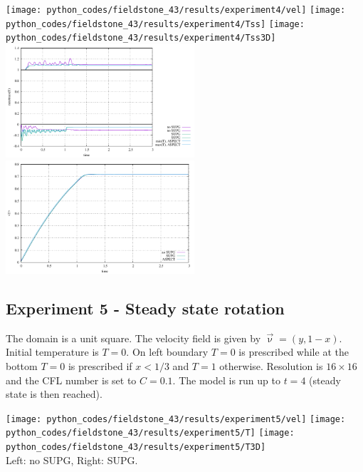 \begin{center}
\texttt{[image: python\_codes/fieldstone\_43/results/experiment4/vel]}
\texttt{[image: python\_codes/fieldstone\_43/results/experiment4/Tss]}
\texttt{[image: python\_codes/fieldstone\_43/results/experiment4/Tss3D]}\\
\includegraphics[width=7cm]{python_codes/fieldstone_43/results/experiment4/stats_T}
\includegraphics[width=7cm]{python_codes/fieldstone_43/results/experiment4/avrg_T}
\end{center}

\subsection*{Experiment 5 - Steady state rotation }

The domain is a unit square. The velocity field is given by $\vec\upnu=(y,1-x)$. Initial temperature is 
$T=0$. On left boundary $T=0$ is prescribed while at the bottom $T=0$ is prescribed if $x<1/3$ and $T=1$
otherwise. Resolution is $16\times16$ and the CFL number is set to $C=0.1$. 
The model is run up to $t=4$ (steady state is then reached).

\begin{center}
\texttt{[image: python\_codes/fieldstone\_43/results/experiment5/vel]}
\texttt{[image: python\_codes/fieldstone\_43/results/experiment5/T]}
\texttt{[image: python\_codes/fieldstone\_43/results/experiment5/T3D]}\\
{\captionfont Left: no SUPG, Right: SUPG.}
\end{center}


